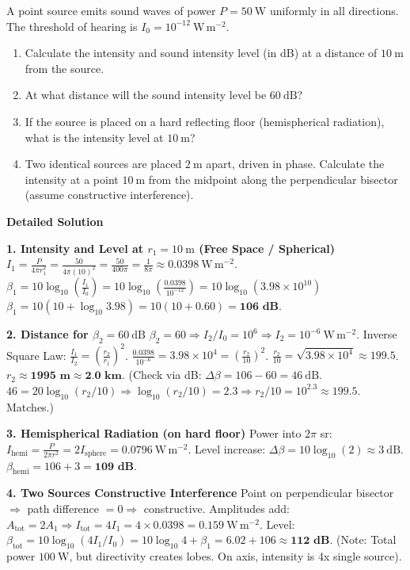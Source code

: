 \documentclass[11pt]{article}
\begin{document}
\begin{exoresolu}
A point source emits sound waves of power $P = 50\ \mathrm{W}$ uniformly in all directions. The threshold of hearing is $I_0 = 10^{-12}\ \mathrm{W\,m^{-2}}$.
\begin{enumerate}
\item Calculate the intensity and sound intensity level (in dB) at a distance of $10\ \mathrm{m}$ from the source.
\item At what distance will the sound intensity level be $60\ \mathrm{dB}$?
\item If the source is placed on a hard reflecting floor (hemispherical radiation), what is the intensity level at $10\ \mathrm{m}$?
\item Two identical sources are placed $2\ \mathrm{m}$ apart, driven in phase. Calculate the intensity at a point $10\ \mathrm{m}$ from the midpoint along the perpendicular bisector (assume constructive interference).
\end{enumerate}
\tcblower
\textbf{Detailed Solution}

\textbf{1. Intensity and Level at $r_1 = 10\ \mathrm{m}$ (Free Space / Spherical)}
$I_1 = \frac{P}{4\pi r_1^2} = \frac{50}{4\pi (10)^2} = \frac{50}{400\pi} = \frac{1}{8\pi} \approx 0.0398\ \mathrm{W\,m^{-2}}$.
$\beta_1 = 10 \log_{10}\left(\frac{I_1}{I_0}\right) = 10 \log_{10}\left(\frac{0.0398}{10^{-12}}\right) = 10 \log_{10}(3.98 \times 10^{10})$
$\beta_1 = 10 (10 + \log_{10} 3.98) = 10 (10 + 0.60) = \textbf{106 dB}$.

\textbf{2. Distance for $\beta_2 = 60\ \mathrm{dB}$}
$\beta_2 = 60 \Rightarrow I_2/I_0 = 10^6 \Rightarrow I_2 = 10^{-6}\ \mathrm{W\,m^{-2}}$.
Inverse Square Law: $\frac{I_1}{I_2} = \left(\frac{r_2}{r_1}\right)^2$.
$\frac{0.0398}{10^{-6}} = 3.98 \times 10^4 = \left(\frac{r_2}{10}\right)^2$.
$\frac{r_2}{10} = \sqrt{3.98 \times 10^4} \approx 199.5$.
$r_2 \approx \textbf{1995 m} \approx \textbf{2.0 km}$.
(Check via dB: $\Delta \beta = 106 - 60 = 46\ \mathrm{dB}$. $46 = 20 \log_{10}(r_2/10) \Rightarrow \log_{10}(r_2/10) = 2.3 \Rightarrow r_2/10 = 10^{2.3} \approx 199.5$. Matches.)

\textbf{3. Hemispherical Radiation (on hard floor)}
Power into $2\pi$ sr: $I_{\text{hemi}} = \frac{P}{2\pi r^2} = 2 I_{\text{sphere}} = 0.0796\ \mathrm{W\,m^{-2}}$.
Level increase: $\Delta \beta = 10 \log_{10}(2) \approx 3\ \mathrm{dB}$.
$\beta_{\text{hemi}} = 106 + 3 = \textbf{109 dB}$.

\textbf{4. Two Sources Constructive Interference}
Point on perpendicular bisector $\Rightarrow$ path difference $= 0 \Rightarrow$ constructive.
Amplitudes add: $A_{\text{tot}} = 2A_1 \Rightarrow I_{\text{tot}} = 4 I_1 = 4 \times 0.0398 = 0.159\ \mathrm{W\,m^{-2}}$.
Level: $\beta_{\text{tot}} = 10 \log_{10}(4 I_1 / I_0) = 10 \log_{10} 4 + \beta_1 = 6.02 + 106 \approx \textbf{112 dB}$.
(Note: Total power $100\ \mathrm{W}$, but directivity creates lobes. On axis, intensity is 4x single source).
\end{exoresolu}
\end{document}
